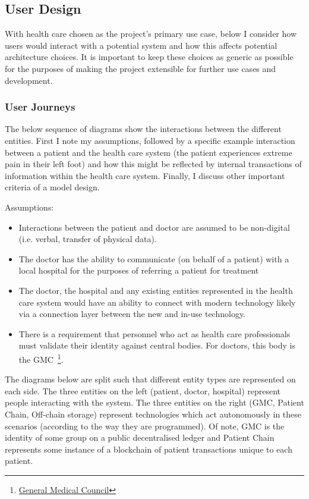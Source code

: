 \subsection{User Design}

With health care chosen as the project's primary use case, below I consider how users would interact with a potential system and how this affects potential architecture choices. It is important to keep these choices as generic as possible for the purposes of making the project extensible for further use cases and development.

\subsubsection{User Journeys}

The below sequence of diagrams show the interactions between the different entities. First I note my assumptions, followed by a specific example interaction between a patient and the health care system (the patient experiences extreme pain in their left foot) and how this might be reflected by internal transactions of information within the health care system. Finally, I discuss other important criteria of a model design.

Assumptions:

\begin{itemize}
  \item Interactions between the patient and doctor are assumed to be non-digital (i.e. verbal, transfer of physical data).
  \item The doctor has the ability to communicate (on behalf of a patient) with a local hospital for the purposes of referring a patient for treatment
  \item The doctor, the hospital and any existing entities represented in the health care system would have an ability to connect with modern technology likely via a connection layer between the new and in-use technology.
  \item There is a requirement that personnel who act as health care professionals must validate their identity against central bodies. For doctors, this body is the GMC~\footnote{\href{http://www.gmc-uk.org/}{General Medical Council}}.
\end{itemize}

The diagrams below are split such that different entity types are represented on each side. The three entities on the left (patient, doctor, hospital) represent people interacting with the system. The three entities on the right (GMC, Patient Chain, Off-chain storage) represent technologies which act autonomously in these scenarios (according to the way they are programmed). Of note, GMC is the identity of some group on a public decentralised ledger and Patient Chain represents some instance of a blockchain of patient transactions unique to each patient.

